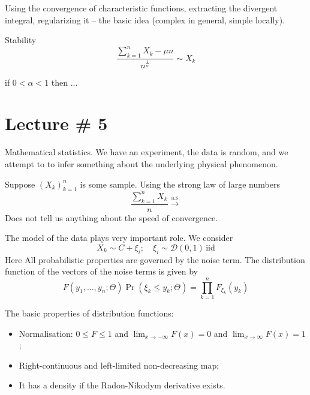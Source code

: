 \documentclass[a4paper]{article}
\newcommand{\brac}[1]{{\left ( #1 \right )}}
\newcommand{\abs}[1]{{\left | #1 \right |}}
\newcommand{\sign}{\mathop{\text{sgn}}\nolimits}
\begin{document}



Using the convergence of characteristic functions, extracting the divergent integral, regularizing it -- the basic idea (complex in general, simple locally). 

Stability
\[\frac{\sum_{k=1}^n X_k - \mu n}{n^\frac{1}{\alpha}} \sim X_k\]

if $0<\alpha<1$ then ...


\section{Lecture \# 5} %
\label{sec:lecture_5}

Mathematical statistics.
We have an experiment, the data is random, and we attempt to to infer something about the underlying physical phenomenon.

Suppose $\brac{X_k}_{k=1}^n$ is some sample.
Using the strong law of large numbers \[\frac{\sum_{k=1}^n X_k}{n}\overset{\text{a.s}}{\to}\]
Does not tell us anything about the speed of convergence.

The model of the data plays very important role. We consider 
\[X_k \sim C + \xi_i;\quad \xi_i\sim \mathcal{D}(0,1)\,\text{iid}\]
Here All probabilistic properties are governed by the noise term.
The distribution function of the vectors of the noise terms is given by 
\[F\brac{y_1, \ldots, y_n;\Theta} \Pr\brac{\xi_k\leq y_k;\Theta} = \prod_{k=1}^n F_{\xi_k}(y_k)\]

The basic properties of distribution functions:
\begin{itemize}
	\item Normalisation: $0\leq F\leq 1$ and $\lim_{x\to -\infty} F(x)=0$ and $\lim_{x\to \infty} F(x)=1$;
	\item Right-continuous and left-limited non-decreasing map;
	\item It has a density if the Radon-Nikodym derivative exists.
\end{itemize}
\end{document}
